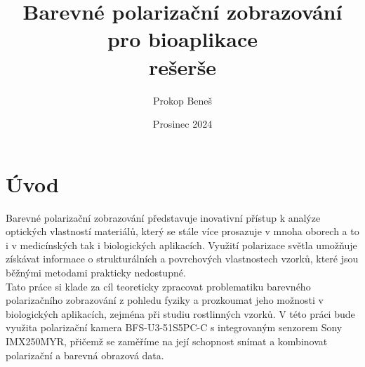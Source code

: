 \documentclass[a4paper]{article}
\title{Barevné polarizační zobrazování pro bioaplikace \\rešerše}
\author{Prokop Beneš}
\date{Prosinec 2024}
\numberwithin{equation}{section}
\begin{document}
	\maketitle
	\newpage

	\tableofcontents
	\newpage

    \section{Úvod}
    Barevné polarizační zobrazování představuje inovativní přístup k analýze optických vlastností materiálů,
    který se stále více prosazuje v mnoha oborech a to i v medicínských tak i biologických aplikacích.
    Využití polarizace světla umožňuje získávat informace o strukturálních a povrchových vlastnostech vzorků,
    které jsou běžnými metodami prakticky nedostupné. 
    \\Tato práce si klade za cíl teoreticky zpracovat problematiku barevného polarizačního zobrazování z
    pohledu fyziky a prozkoumat jeho možnosti v biologických aplikacích, zejména při studiu rostlinných vzorků.
    V této práci bude využita polarizační kamera BFS-U3-51S5PC-C s integrovaným senzorem Sony IMX250MYR,
    přičemž se zaměříme na její schopnost snímat a kombinovat polarizační a barevná obrazová data.
	\newpage
\end{document}
